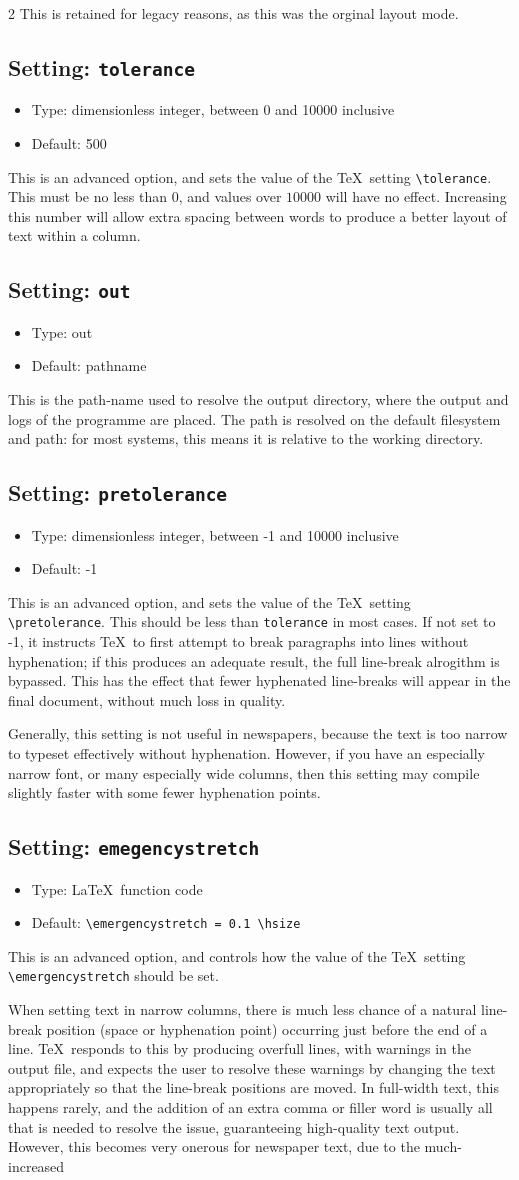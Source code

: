 \documentclass[a4paper,DIV=11]{scrartcl}
\newcommand{\property}[5]{
  \subsection{#1: \texttt{#2}}
  \begin{itemize}
  \item Type: #3
  \item Default: #4
  \end{itemize}
  #5
}
\newcommand{\setting}{\property{Setting}}
\begin{document}
\begin{multicols}{2}
{  This is retained for legacy reasons, as this was the orginal layout mode.
}
\setting{tolerance}{dimensionless integer, between 0 and 10000 inclusive}{500}{
  This is an advanced option, and sets the value of the \TeX\ setting
  \texttt{\textbackslash tolerance}. This must be no less than $0$,
  and values over $10000$ will have no effect. Increasing this number
  will allow extra spacing between words to produce a better layout of
  text within a column.}  \setting{out}{out}{pathname}{This is the
  path-name used to resolve the output directory, where the output and
  logs of the programme are placed. The path is resolved on the
  default filesystem and path: for most systems, this means it is
  relative to the working directory.}
\setting{pretolerance}{dimensionless integer, between -1 and 10000 inclusive}{-1}{
  This is an advanced option, and sets the value of the \TeX\ setting
  \texttt{\textbackslash pretolerance}. This should be less than
  \texttt{tolerance} in most cases. If not set to -1, it instructs
  \TeX\ to first attempt to break paragraphs into lines without
  hyphenation; if this produces an adequate result, the full
  line-break alrogithm is bypassed. This has the effect that fewer
  hyphenated line-breaks will appear in the final document, without
  much loss in quality.\par
  Generally, this setting is not useful in newspapers, because the
  text is too narrow to typeset effectively without
  hyphenation. However, if you have an especially narrow font, or many
  especially wide columns, then this setting may compile slightly
  faster with some fewer hyphenation points.
}
\setting{emegencystretch}{\LaTeX\ function code}{\texttt{\textbackslash emergencystretch = 0.1 \textbackslash hsize}}{
  This is an advanced option, and controls how the value of the \TeX\ setting
  \texttt{\textbackslash emergencystretch} should be set.\par
  When setting text in narrow columns, there is much less chance of a
  natural line-break position (space or hyphenation point) occurring
  just before the end of a line. \TeX\ responds to this by producing
  overfull lines, with warnings in the output file, and expects the
  user to resolve these warnings by changing the text appropriately so
  that the line-break positions are moved. In full-width text, this
  happens rarely, and the addition of an extra comma or filler word is
  usually all that is needed to resolve the issue, guaranteeing
  high-quality text output. However, this
  becomes very onerous for newspaper text, due to the much-increased
}
\end{multicols}
\end{document}
